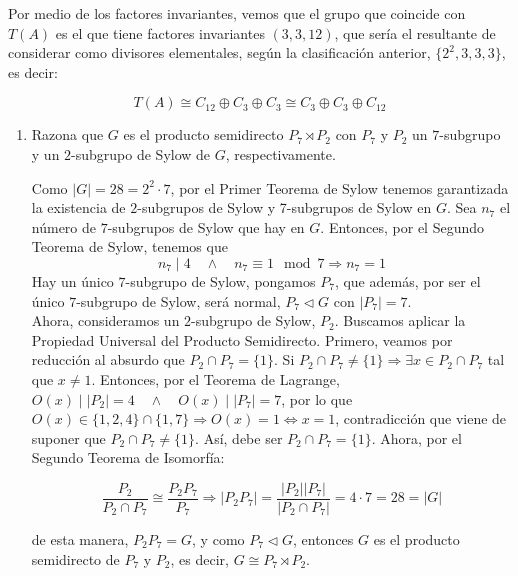 \documentclass[12pt]{article}
\begin{document}
\begin{ejercicio}
\begin{enumerate}[label=(\alph*)]
            Por medio de los factores invariantes, vemos que el grupo que coincide con $T(A)$ es el que tiene factores invariantes $(3,3,12)$, que sería el resultante de considerar como divisores elementales, según la clasificación anterior, $\{2^2, 3, 3, 3\}$, es decir:

            $$T(A) \cong C_{12} \oplus C_3 \oplus C_3 \cong C_3 \oplus C_3 \oplus C_{12}$$

        \end{enumerate}
    \end{ejercicio}

    \begin{ejercicio}
        \begin{enumerate}[label=(\alph*)]
            \item Razona que $G$ es el producto semidirecto $P_7 \rtimes P_2$ con $P_7$ y $P_2$ un $7$-subgrupo y un $2$-subgrupo de Sylow de $G$, respectivamente.
            
            Como $|G| = 28 = 2^2 \cdot 7$, por el Primer Teorema de Sylow tenemos garantizada la existencia de $2$-subgrupos de Sylow y 7-subgrupos de Sylow en $G$. Sea $n_7$ el número de $7$-subgrupos de Sylow que hay en $G$. Entonces, por el Segundo Teorema de Sylow, tenemos que
            $$n_7 \mid 4 \quad \land \quad n_7 \equiv 1 \mod 7 \Longrightarrow n_7 = 1$$
            Hay un único $7$-subgrupo de Sylow, pongamos $P_7$, que además, por ser el único $7$-subgrupo de Sylow, será normal, $P_7 \vartriangleleft G$ con $|P_7| = 7$. \\

            Ahora, consideramos un $2$-subgrupo de Sylow, $P_2$. Buscamos aplicar la Propiedad Universal del Producto Semidirecto. Primero, veamos por reducción al absurdo que $P_2 \cap P_7 = \{1\}$. 
            Si $P_2 \cap P_7 \neq \{1\} \Longrightarrow \exists x \in P_2 \cap P_7$ tal que $x \neq 1$. Entonces, por el Teorema de Lagrange, $O(x) \mid |P_2| = 4 \quad \land \quad O(x) \mid |P_7| = 7$, por lo que $O(x) \in \{1,2,4\} \cap \{1,7\} \Longrightarrow O(x) = 1 \iff x = 1$, 
            contradicción que viene de suponer que $P_2 \cap P_7 \neq \{1\}$. Así, debe ser $P_2 \cap P_7 = \{1\}$. Ahora, por el Segundo Teorema de Isomorfía:

            $$\dfrac{P_2}{P_2 \cap P_7} \cong \dfrac{P_2 P_7}{P_7} \Longrightarrow |P_2P_7| = \dfrac{|P_2| |P_7|}{|P_2 \cap P_7|} = 4 \cdot 7 = 28 = |G|$$

            de esta manera, $P_2 P_7 = G$, y como $P_7 \vartriangleleft G$, entonces $G$ es el producto semidirecto de $P_7$ y $P_2$, es decir, $G \cong P_7 \rtimes P_2$.


\end{enumerate}
\end{ejercicio}
\end{document}
